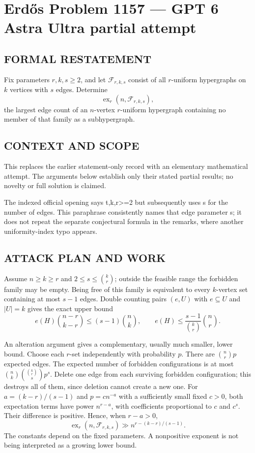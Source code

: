 \section*{Erd\H{o}s Problem 1157 --- GPT 6 Astra Ultra partial attempt}


\subsection*{FORMAL RESTATEMENT}
Fix parameters $r,k,s\geq2$, and let $\mathcal F_{r,k,s}$ consist of all $r$-uniform hypergraphs on $k$ vertices with $s$ edges. Determine
\[
\operatorname{ex}_r(n,\mathcal F_{r,k,s}),
\]
the largest edge count of an $n$-vertex $r$-uniform hypergraph containing no member of that family as a subhypergraph.

\subsection*{CONTEXT AND SCOPE}
This replaces the earlier statement-only record with an elementary mathematical attempt. The arguments below establish only their stated partial results; no novelty or full solution is claimed.

The indexed official opening says t,k,r>=2 but subsequently uses s for the number of edges. This paraphrase consistently names that edge parameter s; it does not repeat the separate conjectural formula in the remarks, where another uniformity-index typo appears.

\subsection*{ATTACK PLAN AND WORK}
Assume $n\ge k\ge r$ and $2\le s\le\binom kr$; outside the feasible range
the forbidden family may be empty. Being free of this family is equivalent to
every $k$-vertex set containing at most $s-1$ edges. Double counting pairs
$(e,U)$ with $e\subseteq U$ and $|U|=k$ gives the exact upper bound
\[e(H)\binom{n-r}{k-r}\le(s-1)\binom nk,
\qquad e(H)\le\frac{s-1}{\binom kr}\binom nr.\tag{1}\]

An alteration argument gives a complementary, usually much smaller, lower bound.
Choose each $r$-set independently with probability $p$. There are $\binom nr p$
expected edges. The expected number of forbidden configurations is at most
$\binom nk\binom{\binom kr}{s}p^s$. Delete one edge from each surviving forbidden
configuration; this destroys all of them, since deletion cannot create a new one.
For $a=(k-r)/(s-1)$ and $p=c n^{-a}$ with a sufficiently small fixed $c>0$,
both expectation terms have power $n^{r-a}$, with coefficients proportional
to $c$ and $c^s$. Their difference is positive. Hence, when $r-a>0$,
\[\operatorname{ex}_r(n,\mathcal F_{r,k,s})\gg n^{r-(k-r)/(s-1)}.\tag{2}\]
The constants depend on the fixed parameters. A nonpositive exponent is not
being interpreted as a growing lower bound.

